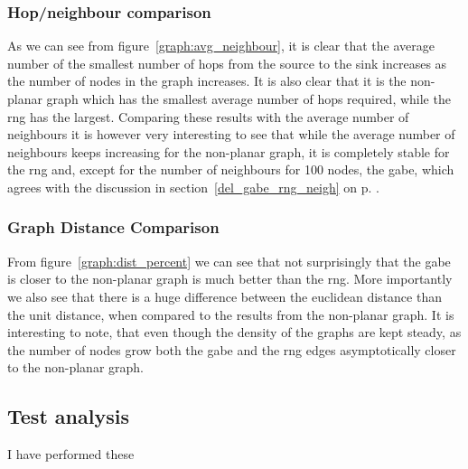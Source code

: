 \subsubsection{Hop/neighbour comparison}
\label{section:hop_neighbour_comparison}

As we can see from figure~\ref{graph:avg_neighbour}, it is clear that the average number of the smallest number of hops from the source to the sink increases as the number of nodes in the graph increases. It is also clear that it is the non-planar graph which has the smallest average number of hops required, while the \ac{rng} has the largest. Comparing these results with the average number of neighbours it is however very interesting to see that while the average number of neighbours keeps increasing for the non-planar graph, it is completely stable for the \ac{rng} and, except for the number of neighbours for 100 nodes, the \ac{gabe}, which agrees with the discussion in section~\ref{del_gabe_rng_neigh} on p. \pageref{del_gabe_rng_neigh}. 

\subsubsection{Graph Distance Comparison}
\label{section:graph_distance_comparison}


From figure~\ref{graph:dist_percent} we can see that not surprisingly that the \ac{gabe} is closer to the non-planar graph is much better than the \ac{rng}. More importantly we also see that there is a huge difference between the euclidean distance than the unit distance, when compared to the results from the non-planar graph. It is interesting to note, that even though the density of the graphs are kept steady, as the number of nodes grow both the \ac{gabe} and the \ac{rng} edges asymptotically closer to the non-planar graph. 

\subsection{}







\subsection{Test analysis}


I have performed these


\subsection{}
\label{section:test_results_spanners}
